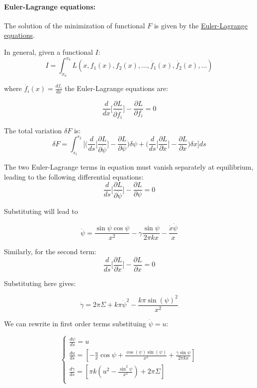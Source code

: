 \documentclass[12pt]{article}
\begin{document}
\paragraph*{Euler-Lagrange equations:} 

The solution of the minimization of functional $F$ is given by the \href{https://en.wikipedia.org/wiki/Euler%E2%80%93Lagrange_equation}{Euler-Lagrange equations}. 

In general, given a functional $I$:
$$I=\int_{x_a}^{x_b}L(x,f_1(x),f_2(x),\dots,\dot{f_1}(x),\dot{f_2}(x),\dots)$$

where $\dot{f_i}(x)=\frac{df_i}{dx}$ the Euler-Lagrange equations are:

$$
\frac{d}{dx}\bigg[ \frac{\partial L}{\partial \dot{f_i}} \bigg] - \frac{\partial L}{\partial f_i} = 0
$$

The total variation $\delta F$ is:
 $$
 \delta F = \int_{s_1}^{s_2} \bigg[ \bigg(  \frac{d}{ds}\bigg[ \frac{\partial L}{\partial \dot{\psi}} \bigg] - \frac{\partial L}{\partial \psi} \bigg)\delta \psi + \bigg(  \frac{d}{ds}\bigg[ \frac{\partial L}{\partial \dot{x}} \bigg] - \frac{\partial L}{\partial x} \bigg)\delta x \bigg] ds 
 $$


The two Euler-Lagrange terms in equation must vanish separately at equilibrium, leading to the following differential equations:
 $$
 \frac{d}{ds}\bigg[ \frac{\partial L}{\partial \dot{\psi}} \bigg] - \frac{\partial L}{\partial \psi}  = 0
 $$

Substituting will lead to 

$$
\ddot{\psi} = \frac{\sin \psi \cos \psi}{x^2} - \gamma \frac{\sin \psi}{2 \pi k x} - \frac{\dot{x} \dot{\psi}}{x}
$$

Similarly, for the second term:
$$
\frac{d}{ds}\bigg[ \frac{\partial L}{\partial \dot{x}} \bigg] - \frac{\partial L}{\partial x} = 0
$$

Substituting here gives: 

$$
\dot{\gamma} = 2 \pi \Sigma + k \pi \dot{\psi}^2 - \frac{k \pi \sin(\psi)^2}{x^2}
$$

We can rewrite in first order terms substituing $\dot{\psi} =u$: 

\begin{equation}
  \begin{cases} 
    \frac{d\psi}{ds} =  u \\[3mm]
    \frac{du}{ds} =  [-\frac{u}{x}\cos\psi+\frac{\cos(\psi)\sin(\psi)}{x^2}+\frac{\gamma\sin \psi}{2\pi k x}] \\[3mm]
    \frac{d\gamma}{ds} =  [\pi k (u^2-\frac{\sin^2 \psi}{x^2})+2 \pi \Sigma] \\[3mm]
  \end{cases}
\end{equation}
\end{document}
